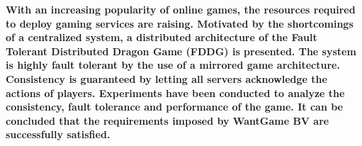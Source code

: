 \textbf{With an increasing popularity of online games, the resources required to deploy gaming services are raising. Motivated by the shortcomings of a centralized system, a distributed architecture of the Fault Tolerant Distributed Dragon Game (FDDG) is presented. The system is highly fault tolerant by the use of a mirrored game architecture. Consistency is guaranteed by letting all servers acknowledge the actions of  players. Experiments have been conducted to analyze the consistency, fault tolerance and performance of the game. It can be concluded that the requirements imposed by WantGame BV are successfully satisfied.}